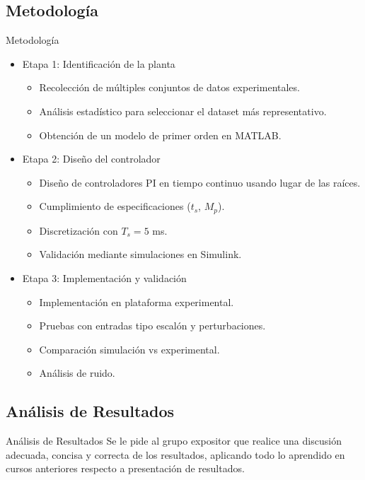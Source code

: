 \documentclass[mathserif,spanish]{beamer}
\begin{document}
        \subsection{Metodología}
\begin{frame}{Metodología}
\begin{itemize}
    \item Etapa 1: Identificación de la planta
    \begin{itemize}
        \item Recolección de múltiples conjuntos de datos experimentales.
        \item Análisis estadístico para seleccionar el dataset más representativo.
        \item Obtención de un modelo de primer orden en MATLAB.
    \end{itemize}
    
    \item Etapa 2: Diseño del controlador
    \begin{itemize}
        \item Diseño de controladores PI en tiempo continuo usando lugar de las raíces.
        \item Cumplimiento de especificaciones ($t_s$, $M_p$).
        \item Discretización con $T_s = 5$ ms.
        \item Validación mediante simulaciones en Simulink.
    \end{itemize}
    
    \item Etapa 3: Implementación y validación
    \begin{itemize}
        \item Implementación en plataforma experimental.
        \item Pruebas con entradas tipo escalón y perturbaciones.
        \item Comparación simulación vs experimental.
        \item Análisis de ruido.
    \end{itemize}
\end{itemize}
\end{frame}     %

    \subsection{Análisis de Resultados}
        \begin{frame}{Análisis de Resultados}
            Se le pide al grupo expositor que realice una discusión adecuada, concisa y correcta de los resultados, aplicando todo lo aprendido en cursos anteriores respecto a presentación de resultados.
        \end{frame}  %
\end{document}
